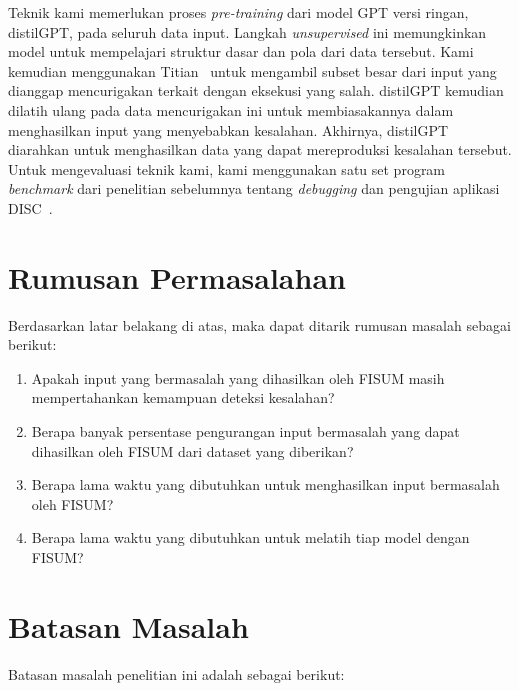 Teknik kami memerlukan proses \emph{pre-training} 
dari model GPT versi ringan, distilGPT, pada seluruh 
data input. Langkah \emph{unsupervised} ini 
memungkinkan model untuk mempelajari struktur 
dasar dan pola dari data tersebut. Kami kemudian 
menggunakan Titian~\cite{interlandi2015} untuk mengambil subset besar 
dari input yang dianggap mencurigakan terkait 
dengan eksekusi yang salah. distilGPT kemudian 
dilatih ulang pada data mencurigakan ini untuk 
membiasakannya dalam menghasilkan input yang 
menyebabkan kesalahan. Akhirnya, distilGPT diarahkan 
untuk menghasilkan data yang dapat mereproduksi 
kesalahan tersebut.
Untuk mengevaluasi teknik kami, kami menggunakan satu 
set program \emph{benchmark} dari penelitian sebelumnya 
tentang \emph{debugging} dan pengujian aplikasi 
DISC~\cite{gulzar2019,humayun2023,zhang2021}. 

\section{Rumusan Permasalahan}
\label{sec:permasalahan}

Berdasarkan latar belakang di atas, maka dapat ditarik rumusan masalah sebagai berikut:

\begin{enumerate}[nolistsep]

   \item Apakah input yang bermasalah yang dihasilkan oleh FISUM masih mempertahankan kemampuan deteksi kesalahan?

   \item Berapa banyak persentase pengurangan input bermasalah yang dapat dihasilkan oleh FISUM dari dataset yang diberikan?

   \item Berapa lama waktu yang dibutuhkan untuk menghasilkan input bermasalah oleh FISUM?
   
   \item Berapa lama waktu yang dibutuhkan untuk melatih tiap model dengan FISUM?

\end{enumerate}

\section{Batasan Masalah}
\label{sec:batasanmasalah}

Batasan masalah penelitian ini adalah sebagai berikut:

